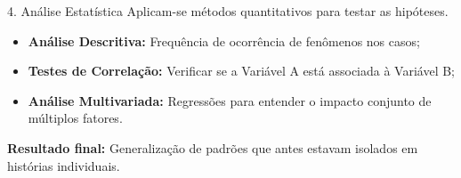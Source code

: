 \begin{frame}{4. Análise Estatística}
    \justifying
    Aplicam-se métodos quantitativos para testar as hipóteses.

    \vspace{0.8em}
    \begin{itemize}
        \item \textbf{Análise Descritiva:} Frequência de ocorrência de fenômenos nos casos;
        \item \textbf{Testes de Correlação:} Verificar se a Variável A está associada à Variável B;
        \item \textbf{Análise Multivariada:} Regressões para entender o impacto conjunto de múltiplos fatores.
    \end{itemize}

    \vspace{0.8em}
    \centering
    \textbf{Resultado final:} Generalização de padrões que antes estavam isolados em histórias individuais.
\end{frame}